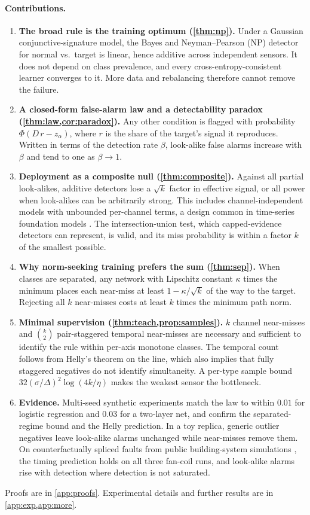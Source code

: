 \documentclass{article}
\theoremstyle{definition}
\theoremstyle{remark}
\renewcommand{\1}{\mathbf{1}}
\begin{document}
\paragraph{Contributions.}
\begin{enumerate}[leftmargin=*,itemsep=1pt,topsep=2pt]
\item \textbf{The broad rule is the training optimum (\cref{thm:np}).} Under a Gaussian conjunctive-signature model, the Bayes and Neyman--Pearson (NP) detector for normal vs.\ target is linear, hence additive across independent sensors. It does not depend on class prevalence, and every cross-entropy-consistent learner converges to it. More data and rebalancing therefore cannot remove the failure.
\item \textbf{A closed-form false-alarm law and a detectability paradox (\cref{thm:law,cor:paradox}).} Any other condition is flagged with probability $\Phi(D\,r-z_\alpha)$, where $r$ is the share of the target's signal it reproduces. Written in terms of the detection rate $\beta$, look-alike false alarms increase with $\beta$ and tend to one as $\beta\to1$.
\item \textbf{Deployment as a composite null (\cref{thm:composite}).} Against all partial look-alikes, additive detectors lose a $\sqrt{k}$ factor in effective signal, or all power when look-alikes can be arbitrarily strong. This includes channel-independent models with unbounded per-channel terms, a design common in time-series foundation models \citep{nie2023,goswami2024}. The intersection-union test, which capped-evidence detectors can represent, is valid, and its miss probability is within a factor $k$ of the smallest possible.
\item \textbf{Why norm-seeking training prefers the sum (\cref{thm:sep}).} When classes are separated, any network with Lipschitz constant $\kappa$ times the minimum places each near-miss at least $1-\kappa/\sqrt{k}$ of the way to the target. Rejecting all $k$ near-misses costs at least $k$ times the minimum path norm.
\item \textbf{Minimal supervision (\cref{thm:teach,prop:samples}).} $k$ channel near-misses and $\binom{k}{2}$ pair-staggered temporal near-misses are necessary and sufficient to identify the rule within per-axis monotone classes. The temporal count follows from Helly's theorem on the line, which also implies that fully staggered negatives do not identify simultaneity. A per-type sample bound $32(\sigma/\Delta)^2\log(4k/\eta)$ makes the weakest sensor the bottleneck.
\item \textbf{Evidence.} Multi-seed synthetic experiments match the law to within $0.01$ for logistic regression and $0.03$ for a two-layer net, and confirm the separated-regime bound and the Helly prediction. In a toy replica, generic outlier negatives leave look-alike alarms unchanged while near-misses remove them. On counterfactually spliced faults from public building-system simulations \citep{granderson2023}, the timing prediction holds on all three fan-coil runs, and look-alike alarms rise with detection where detection is not saturated.
\end{enumerate}
Proofs are in \cref{app:proofs}. Experimental details and further results are in \cref{app:exp,app:more}.
\end{document}
